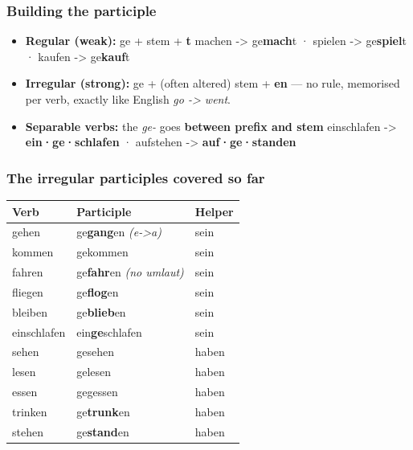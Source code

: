 \documentclass[
  11pt,
]{article}
\newcounter{none} %
\providecommand{\tightlist}{%
  \setlength{\itemsep}{0pt}\setlength{\parskip}{0pt}}
\begin{document}
\subsubsection{Building the participle}\label{building-the-participle}

\begin{itemize}
\tightlist
\item
  \textbf{Regular (weak):} ge + stem + \textbf{t} machen -\textgreater{}
  ge\textbf{mach}t · spielen -\textgreater{} ge\textbf{spiel}t · kaufen
  -\textgreater{} ge\textbf{kauf}t
\item
  \textbf{Irregular (strong):} ge + (often altered) stem + \textbf{en}
  --- no rule, memorised per verb, exactly like English \emph{go
  -\textgreater{} went}.
\item
  \textbf{Separable verbs:} the \emph{ge-} goes \textbf{between prefix
  and stem} einschlafen -\textgreater{} \textbf{ein·ge·schlafen} ·
  aufstehen -\textgreater{} \textbf{auf·ge·standen}
\end{itemize}

\subsubsection{The irregular participles covered so
far}\label{the-irregular-participles-covered-so-far}

{\def\LTcaptype{none} %
\begin{longtable}[]{@{}lll@{}}
\toprule\noalign{}
Verb & Participle & Helper \\
\midrule\noalign{}
\endhead
\bottomrule\noalign{}
\endlastfoot
gehen & ge\textbf{gang}en \emph{(e-\textgreater a)} & sein \\
kommen & gekommen & sein \\
fahren & ge\textbf{fahr}en \emph{(no umlaut)} & sein \\
fliegen & ge\textbf{flog}en & sein \\
bleiben & ge\textbf{blieb}en & sein \\
einschlafen & ein\textbf{ge}schlafen & sein \\
sehen & gesehen & haben \\
lesen & gelesen & haben \\
essen & gegessen & haben \\
trinken & ge\textbf{trunk}en & haben \\
stehen & ge\textbf{stand}en & haben \\
\end{longtable}
}
\end{document}
